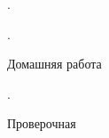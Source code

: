 \begin{class}[number=6]
	\begin{listofex}
		\item .
	\end{listofex}
\end{class}

\begin{class}[number=7]
	\begin{listofex}
		\item .
	\end{listofex}
\end{class}

\begin{homework}[number=3]
	\begin{listofex}
		\item Домашняя работа
	\end{listofex}
\end{homework}

\begin{class}[number=8]
	\begin{listofex}
		\item .
	\end{listofex}
\end{class}

\begin{exam}
	\begin{listofex}
		\item Проверочная
	\end{listofex}
\end{exam}

